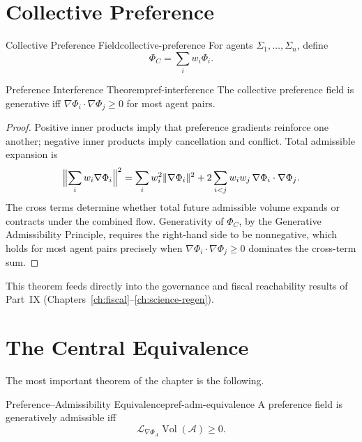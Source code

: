 \documentclass[12pt,twoside,openright]{book}
\newcommand{\adm}{\mathcal{A}}
\newcommand{\Vol}{\operatorname{Vol}}
\begin{document}
\section{Collective Preference}
\label{sec:ch22-collective}

\begin{definition}{Collective Preference Field}{collective-preference}
  For agents $\Sigma_1, \ldots, \Sigma_n$, define
  \[
    \Phi_C = \sum_i w_i \Phi_i.
  \]
\end{definition}

\begin{theorem}{Preference Interference Theorem}{pref-interference}
  The collective preference field is generative iff
  $\nabla\Phi_i \cdot \nabla\Phi_j \ge 0$ for most agent
  pairs.
\end{theorem}

\begin{proof}
  Positive inner products imply that preference gradients
  reinforce one another; negative inner products imply
  cancellation and conflict. Total admissible expansion is
  \[
    \Bigl\|\sum_i w_i \nabla\Phi_i\Bigr\|^2
    = \sum_i w_i^2 \|\nabla\Phi_i\|^2
      + 2\sum_{i<j} w_i w_j\, \nabla\Phi_i \cdot \nabla\Phi_j.
  \]
  The cross terms determine whether total future admissible
  volume expands or contracts under the combined flow.
  Generativity of $\Phi_C$, by the Generative Admissibility
  Principle, requires the right-hand side to be
  nonnegative, which holds for most agent pairs precisely
  when $\nabla\Phi_i \cdot \nabla\Phi_j \ge 0$ dominates the
  cross-term sum.
\end{proof}

This theorem feeds directly into the governance and fiscal
reachability results of Part~IX
(Chapters~\ref{ch:fiscal}--\ref{ch:science-regen}).

\section{The Central Equivalence}
\label{sec:ch22-equivalence}

The most important theorem of the chapter is the following.

\begin{theorem}{Preference--Admissibility Equivalence}{pref-adm-equivalence}
  A preference field is generatively admissible iff
  \[
    \mathcal{L}_{\nabla\Phi_A} \Vol(\adm) \ge 0.
  \]
\end{theorem}
\end{document}
